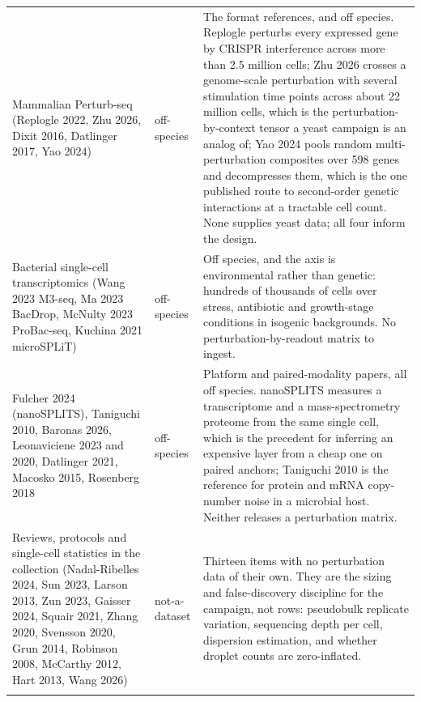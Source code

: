 \begin{longtable}{@{}L{62mm} L{22mm} L{85mm}@{}}
\addlinespace[5pt]
Mammalian Perturb-seq (Replogle 2022, Zhu 2026, Dixit 2016, Datlinger 2017, Yao 2024) & off-species & The format references, and off species. Replogle perturbs every expressed gene by CRISPR interference across more than 2.5 million cells; Zhu 2026 crosses a genome-scale perturbation with several stimulation time points across about 22 million cells, which is the perturbation-by-context tensor a yeast campaign is an analog of; Yao 2024 pools random multi-perturbation composites over 598 genes and decompresses them, which is the one published route to second-order genetic interactions at a tractable cell count. None supplies yeast data; all four inform the design. \\
\addlinespace[5pt]
Bacterial single-cell transcriptomics (Wang 2023 M3-seq, Ma 2023 BacDrop, McNulty 2023 ProBac-seq, Kuchina 2021 microSPLiT) & off-species & Off species, and the axis is environmental rather than genetic: hundreds of thousands of cells over stress, antibiotic and growth-stage conditions in isogenic backgrounds. No perturbation-by-readout matrix to ingest. \\
\addlinespace[5pt]
Fulcher 2024 (nanoSPLITS), Taniguchi 2010, Baronas 2026, Leonaviciene 2023 and 2020, Datlinger 2021, Macosko 2015, Rosenberg 2018 & off-species & Platform and paired-modality papers, all off species. nanoSPLITS measures a transcriptome and a mass-spectrometry proteome from the same single cell, which is the precedent for inferring an expensive layer from a cheap one on paired anchors; Taniguchi 2010 is the reference for protein and mRNA copy-number noise in a microbial host. Neither releases a perturbation matrix. \\
\addlinespace[5pt]
Reviews, protocols and single-cell statistics in the collection (Nadal-Ribelles 2024, Sun 2023, Larson 2013, Zun 2023, Gaisser 2024, Squair 2021, Zhang 2020, Svensson 2020, Grun 2014, Robinson 2008, McCarthy 2012, Hart 2013, Wang 2026) & not-a-dataset & Thirteen items with no perturbation data of their own. They are the sizing and false-discovery discipline for the campaign, not rows: pseudobulk replicate variation, sequencing depth per cell, dispersion estimation, and whether droplet counts are zero-inflated. \\
\addlinespace[5pt]
\end{longtable}
\endgroup
